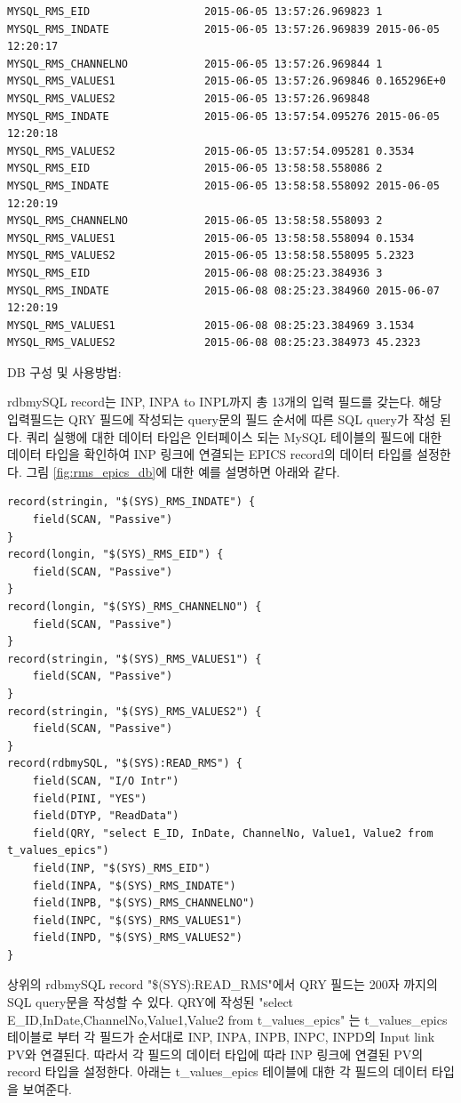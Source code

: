 \documentclass[11pt
  , a4paper
  , article
  , oneside
]{memoir}
\begin{document}
\begin{lstlisting}[style=termstyle]
MYSQL_RMS_EID                  2015-06-05 13:57:26.969823 1  
MYSQL_RMS_INDATE               2015-06-05 13:57:26.969839 2015-06-05 12:20:17  
MYSQL_RMS_CHANNELNO            2015-06-05 13:57:26.969844 1  
MYSQL_RMS_VALUES1              2015-06-05 13:57:26.969846 0.165296E+0  
MYSQL_RMS_VALUES2              2015-06-05 13:57:26.969848   
MYSQL_RMS_INDATE               2015-06-05 13:57:54.095276 2015-06-05 12:20:18  
MYSQL_RMS_VALUES2              2015-06-05 13:57:54.095281 0.3534  
MYSQL_RMS_EID                  2015-06-05 13:58:58.558086 2  
MYSQL_RMS_INDATE               2015-06-05 13:58:58.558092 2015-06-05 12:20:19  
MYSQL_RMS_CHANNELNO            2015-06-05 13:58:58.558093 2  
MYSQL_RMS_VALUES1              2015-06-05 13:58:58.558094 0.1534  
MYSQL_RMS_VALUES2              2015-06-05 13:58:58.558095 5.2323  
MYSQL_RMS_EID                  2015-06-08 08:25:23.384936 3  
MYSQL_RMS_INDATE               2015-06-08 08:25:23.384960 2015-06-07 12:20:19  
MYSQL_RMS_VALUES1              2015-06-08 08:25:23.384969 3.1534  
MYSQL_RMS_VALUES2              2015-06-08 08:25:23.384973 45.2323  
\end{lstlisting}

DB 구성 및 사용방법:

rdbmySQL record는 INP, INPA to INPL까지 총 13개의 입력 필드를 갖는다. 해당 입력필드는 QRY 필드에 작성되는 query문의 필드 순서에 따른 SQL query가 작성 된다. 쿼리 실행에 대한 데이터 타입은 인터페이스 되는 MySQL 테이블의 필드에 대한 데이터 타입을 확인하여 INP 링크에 연결되는 EPICS record의 데이터 타입를 설정한다. 그림 \ref{fig:rms_epics_db}에 대한 예를 설명하면 아래와 같다.

\begin{lstlisting}[style=termstyle]
record(stringin, "$(SYS)_RMS_INDATE") {
	field(SCAN, "Passive")
}
record(longin, "$(SYS)_RMS_EID") {
	field(SCAN, "Passive")
}
record(longin, "$(SYS)_RMS_CHANNELNO") {
	field(SCAN, "Passive")
}
record(stringin, "$(SYS)_RMS_VALUES1") {
	field(SCAN, "Passive")
}
record(stringin, "$(SYS)_RMS_VALUES2") {
	field(SCAN, "Passive")
}
record(rdbmySQL, "$(SYS):READ_RMS") {
	field(SCAN, "I/O Intr")
	field(PINI, "YES")
	field(DTYP, "ReadData")
	field(QRY, "select E_ID, InDate, ChannelNo, Value1, Value2 from t_values_epics")
	field(INP, "$(SYS)_RMS_EID")
	field(INPA, "$(SYS)_RMS_INDATE")
	field(INPB, "$(SYS)_RMS_CHANNELNO")
	field(INPC, "$(SYS)_RMS_VALUES1")
	field(INPD, "$(SYS)_RMS_VALUES2")
}
\end{lstlisting}
상위의 rdbmySQL record "\$(SYS):READ\_RMS"에서 QRY 필드는 200자 까지의 SQL query문을 작성할 수 있다.  QRY에 작성된 "select E\_ID,InDate,ChannelNo,Value1,Value2 from t\_values\_epics" 는  t\_values\_epics 테이블로 부터 각 필드가 순서대로 INP, INPA, INPB, INPC, INPD의 Input link PV와 연결된다. 따라서 각 필드의 데이터 타입에 따라 INP 링크에 연결된 PV의 record 타입을 설정한다. 아래는 t\_values\_epics 테이블에 대한 각 필드의 데이터 타입을 보여준다.
\end{document}
